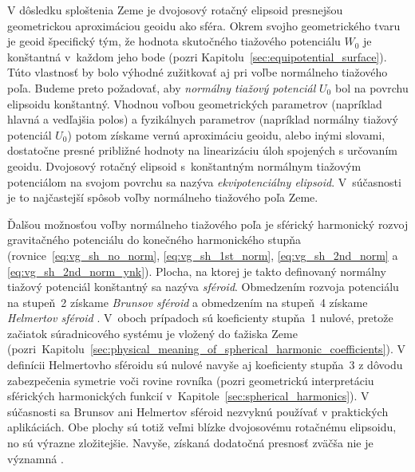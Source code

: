 \documentclass[a4paper,12pt]{book}
\begin{document}
V dôsledku sploštenia Zeme je dvojosový rotačný elipsoid presnejšou 
geometrickou aproximáciou geoidu ako sféra.  Okrem svojho geometrického tvaru 
je geoid špecifický tým, že hodnota skutočného tiažového potenciálu $W_0$ je 
konštantná v~každom jeho bode (pozri Kapitolu~\ref{sec:equipotential_surface}).  
Túto vlastnosť by bolo výhodné zužitkovať aj pri voľbe normálneho tiažového 
poľa.  Budeme preto požadovať, aby \emph{normálny tiažový potenciál} $U_0$ bol 
na povrchu elipsoidu konštantný.  Vhodnou voľbou geometrických parametrov 
(napríklad hlavná a vedľajšia polos) a fyzikálnych parametrov (napríklad 
normálny tiažový potenciál $U_0$) potom získame vernú aproximáciu geoidu, alebo 
inými slovami, dostatočne presné približné hodnoty na linearizáciu úloh 
spojených s určovaním geoidu.  Dvojosový rotačný elipsoid s~konštantným 
normálnym tiažovým potenciálom na svojom povrchu sa nazýva 
\emph{ekvipotenciálny elipsoid}.  V~súčasnosti je to najčastejší spôsob voľby 
normálneho tiažového poľa Zeme.

Ďalšou možnosťou voľby normálneho tiažového poľa je sférický harmonický rozvoj 
gravitačného potenciálu do konečného harmonického stupňa 
(rovnice~\ref{eq:vg_sh_no_norm}, \ref{eq:vg_sh_1st_norm}, 
\ref{eq:vg_sh_2nd_norm} a \ref{eq:vg_sh_2nd_norm_ynk}).  Plocha, na ktorej je 
takto definovaný normálny tiažový potenciál konštantný sa nazýva 
\emph{sféroid}.  Obmedzením rozvoja potenciálu na stupeň~2 získame 
\emph{Brunsov sféroid} a obmedzením na stupeň~4 získame \emph{Helmertov 
sféroid} \parencite{Moritz1967}.  V~oboch prípadoch sú koeficienty stupňa~1 
nulové, pretože začiatok súradnicového systému je vložený do ťažiska Zeme 
(pozri~Kapitolu~\ref{sec:physical_meaning_of_spherical_harmonic_coefficients}).  
V definícii Helmertovho sféroidu sú nulové navyše aj koeficienty stupňa~3 
z dôvodu zabezpečenia symetrie voči rovine rovníka (pozri geometrickú 
interpretáciu sférických harmonických funkcií 
v~Kapitole~\ref{sec:spherical_harmonics}).  V súčasnosti sa Brunsov ani 
Helmertov sféroid nezvyknú používať v praktických aplikáciách.  Obe plochy sú 
totiž veľmi blízke dvojosovému rotačnému elipsoidu, no sú výrazne zložitejšie.  
Navyše, získaná dodatočná presnosť zväčša nie je významná 
\parencite{Moritz1967}.
\end{document}
